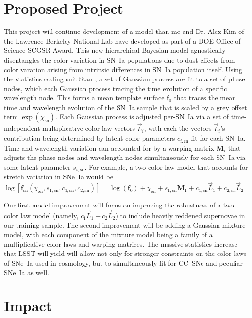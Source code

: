 \documentclass[modern]{aastex63}
\begin{document}
\section{Proposed Project}
This project will continue development of a model than me and Dr. Alex Kim of the Lawrence Berkeley National Lab have developed as part of a DOE Office of Science SCGSR Award. 
This new hierarchical Bayesian model agnostically disentangles the color variation in SN~Ia populations due to dust effects from color varation arising from intrinsic differences in SN~Ia population itself.  
Using the statistics coding suit Stan \citep{STAN}, a set of Gaussian process are fit to a set of phase nodes, which each Gaussian process tracing the time evolution of a specific wavelength node.
This forms a mean template surface $\textbf{f}_0$ that traces the mean time and wavelength evolution of the SN~Ia sample that is scaled by a grey offset term $\exp(\chi_{\text{sn}})$.
Each Gaussian process is adjusted per-SN~Ia via a set of time-independent multiplicative color law vectors $\vec{L}_i$, with each the vectors $\vec{L}_i$'s contribution being determined by latent color parameters $c_{i,\text{sn}}$ fit for each SN~Ia. 
Time and wavelength variation can accounted for by a warping matrix $\textbf{M}_i$ that adjusts the phase nodes and wavelength nodes simultaneously for each SN~Ia via some latent parameter $s_{i,\text{sn}}$.
For example, a two color law model that accounts for stretch variation in SNe~Ia would be $\log[\textbf{f}_{\text{sn}}(\chi_{\text{sn}}, s_{1,\text{sn}}, c_{1,\text{sn}}, c_{2,\text{sn}})] = \log(\textbf{f}_0) + \chi_{\text{sn}} + s_{1,\text{sn}}\textbf{M}_1 + c_{1,\text{sn}}\vec{L}_1 + c_{2,\text{sn}}\vec{L}_2$

Our first model improvement will focus on improving the robustness of a two color law model (namely, $c_1\vec{L}_1 + c_2\vec{L}_2$) to include heavily reddened supernovae in our training sample. 
The second improvement will be adding a Gaussian mixture model, with each component of the mixture model being a family of a multiplicative color laws and warping matrices. 
The massive statistics increase that LSST will yield will allow not only for stronger constraints on the color laws of SNe~Ia used in cosmology, but to simultaneously fit for CC~SNe and peculiar SNe~Ia as well.
\section{Impact}




\end{document}
